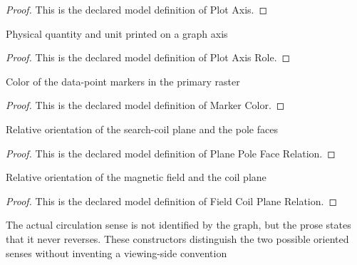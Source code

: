 \begin{proof}
  This is the declared model definition of Plot Axis.
\end{proof}
\begin{definition}
  \label{def:physics:phyx-mini-0980:phyxminiproblems-problemphyxmini0980-plotaxisrole}
  Physical quantity and unit printed on a graph axis
\end{definition}
\begin{proof}
  This is the declared model definition of Plot Axis Role.
\end{proof}
\begin{definition}
  \label{def:physics:phyx-mini-0980:phyxminiproblems-problemphyxmini0980-markercolor}
  Color of the data-point markers in the primary raster
\end{definition}
\begin{proof}
  This is the declared model definition of Marker Color.
\end{proof}
\begin{definition}
  \label{def:physics:phyx-mini-0980:phyxminiproblems-problemphyxmini0980-planepolefacerelation}
  Relative orientation of the search-coil plane and the pole faces
\end{definition}
\begin{proof}
  This is the declared model definition of Plane Pole Face Relation.
\end{proof}
\begin{definition}
  \label{def:physics:phyx-mini-0980:phyxminiproblems-problemphyxmini0980-fieldcoilplanerelation}
  Relative orientation of the magnetic field and the coil plane
\end{definition}
\begin{proof}
  This is the declared model definition of Field Coil Plane Relation.
\end{proof}
\begin{definition}
  \label{def:physics:phyx-mini-0980:phyxminiproblems-problemphyxmini0980-orientedcurrentsense}
  The actual circulation sense is not identified by the graph, but the prose states that it never reverses. These constructors distinguish the two possible oriented senses without inventing a viewing-side convention
\end{definition}
